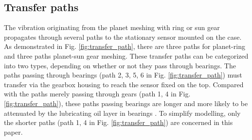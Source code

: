 \documentclass[a4paper,fleqn]{cas-sc}%
\begin{document}
\subsection{Transfer paths\label{sec:transfer_path}}
\par The vibration originating from the planet meshing with ring or sun gear propagates through several paths to the stationary sensor mounted on the case. As demonstrated in Fig. \ref{fig:transfer_path}, there are three paths for planet-ring and three paths planet-sun gear meshing. These transfer paths can be categorized into two types, depending on whether or not they pass through bearings. The paths passing through bearings (path 2, 3, 5, 6 in Fig. \ref{fig:transfer_path}) must transfer via the gearbox housing to reach the sensor fixed on the top. Compared with the paths merely passing through gears (path 1, 4 in Fig. \ref{fig:transfer_path}), these paths passing bearings are longer and more likely to be attenuated by the lubricating oil layer in bearings \cite{Feng2012}. To simplify modelling, only the shorter paths (path 1, 4 in Fig. \ref{fig:transfer_path}) are concerned in this paper.
\end{document}

